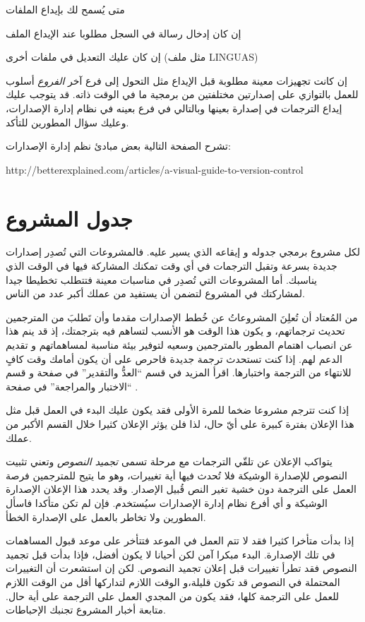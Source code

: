 \startitemize[1]
\item متى يُسمح لك بإيداع الملفات
\item إن كان إدخال رسالة في السجل مطلوبا عند الإيداع الملف
\item إن كان عليك التعديل في ملفات أخرى (مثل ملف LINGUAS)
\item إن كانت تجهيزات معينة مطلوبة قبل الإيداع مثل التحول إلى فرع آخر
\stopitemize
{\it الفروع} أسلوب للعمل بالتوازي على إصدارتين مختلفتين من برمجية ما في
الوقت ذاته. قد يتوجب عليك إيداع الترجمات في إصدارة بعينها وبالتالي في
فرع بعينه في نظام إدارة الإصدارات، وعليك سؤال المطورين للتأكد.

تشرح الصفحة التالية بعض مبادئ نظم إدارة الإصدارات:

http://betterexplained.com/articles/a-visual-guide-to-version-control

\section{جدول المشروع}
لكل مشروع برمجي جدوله و إيقاعه الذي يسير عليه. فالمشروعات التي تُصدِر
إصدارات جديدة بسرعة وتقبل الترجمات في أي وقت تمكنك المشاركة فيها في
الوقت الذي يناسبك. أما المشروعات التي تُصدِر في مناسبات معينة فتتطلب
تخطيطا جيدا لمشاركتك في المشروع لتضمن أن يستفيد من عملك أكبر عدد من
الناس.

من المُعتاد أن تُعلِنَ المشروعاتُ عن خُطط الإصدارات مقدما وأن تَطلبَ من
المترجمين تحديث ترجماتهم، و يكون هذا الوقت هو الأنسب لتساهم فيه
بترجمتك، إذ قد ينم هذا عن انصباب اهتمام المطور بالمترجمين وسعيه لتوفير
بيئة مناسبة لمساهماتهم و تقديم الدعم لهم. إذا كنت تستحدث ترجمة جديدة
فاحرص على أن يكون أمامك وقت كافٍ للانتهاء من الترجمة واختبارها. اقرأ
المزيد في قسم “العدُّ والتقدير” في صفحة  و
قسم “الاختبار والمراجعة” في صفحة .

إذا كنت تترجم مشروعا ضخما للمرة الأولى فقد يكون عليك البدء في العمل قبل
مثل هذا الإعلان بفترة كبيرة على أيّ حال، لذا فلن يؤثر الإعلان كثيرا
خلال القسم الأكبر من عملك.

يتواكب الإعلان عن تلقّي الترجمات مع مرحلة تسمى {\it تجميد النصوص} وتعني
تثبيت النصوص للإصدارة الوشيكة فلا تُحدث فيها أية تغييرات، وهو ما يتيح
للمترجمين فرصة العمل على الترجمة دون خشية تغير النص قُبيل الإصدار. وقد
يحدد هذا الإعلان الإصدارة الوشيكة و أي أفرع نظام إدارة الإصدارات
سيُستخدم. فإن لم تكن متأكدا فاسأل المطورين ولا تخاطر بالعمل على
الإصدارة الخطأ.

إذا بدأت متأخرا كثيرا فقد لا تتم العمل في الموعد فتتأخر على موعد قبول
المساهمات في تلك الإصدارة. البدء مبكرا آمن لكن أحيانا لا يكون أفضل،
فإذا بدأت قبل تجميد النصوص فقد تطرأ تغييرات قبل إعلان تجميد النصوص. لكن
إن استشعرت أن التغييرات المحتملة في النصوص قد تكون قليلة،و الوقت اللازم
لتداركها أقل من الوقت اللازم للعمل على الترجمة كلها، فقد يكون من المجدي
العمل على الترجمة على أية حال. متابعة أخبار المشروع تجنبك الإحباطات.

